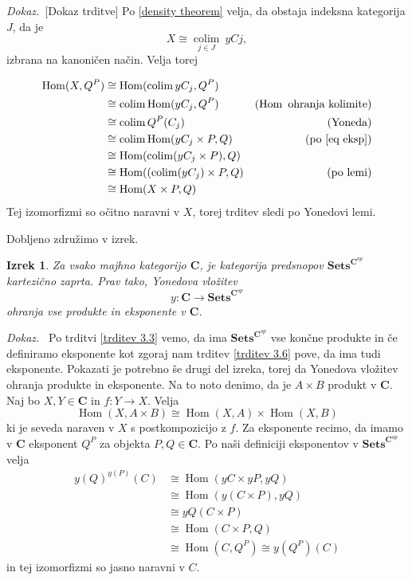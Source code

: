 \documentclass[12pt,a4paper]{book}
\theoremstyle{definition}
\theoremstyle{plain}
\newtheorem{izrek}[definicija]{Izrek}
\newenvironment{dokaz}{\emph{Dokaz.}\ }{\hspace{\fill}{$\Box$}}
\theoremstyle{definition}
\theoremstyle{remark}
\newcommand{\cat}[1]{\textbf{#1}}
\DeclareMathOperator{\Hom}{Hom}
\DeclareMathOperator{\colim}{colim}
\newcommand{\predsnop}[1]{\cat{Sets}^{\cat{#1}^{op}}}
\begin{document}
\begin{dokaz}[Dokaz trditve]
Po \ref{density theorem} velja, da obstaja indeksna kategorija $J$, da je
$$ X \cong \underset{j \in J}{\colim}\> yCj,$$
izbrana na kanoničen način. Velja torej

\begin{align*}
\Hom(X, Q^P) &\cong \Hom(\colim yC_j, Q^P) & \\
&\cong \colim\Hom(yC_j, Q^P) & (\Hom \text{ ohranja kolimite}) \\
&\cong \colim Q^P(C_j) & (\text{Yoneda}) \\
&\cong \colim \Hom(yC_j \times P, Q) & (\text{po \ref{eq eksp}}) \\
&\cong \Hom(\colim(yC_j \times P), Q) & \\
&\cong \Hom((\colim(yC_j) \times P, Q) & (\text{po lemi}) \\
&\cong \Hom(X \times P, Q) \\
\end{align*}
Tej izomorfizmi so očitno naravni v $X$, torej trditev sledi po Yonedovi lemi.
\end{dokaz}

Dobljeno združimo v izrek.

\begin{izrek}
Za vsako majhno kategorijo $\cat{C}$, je kategorija predsnopov $\predsnop{C}$ kartezično zaprta. Prav tako, Yonedova vložitev
$$y : \cat{C} \to \predsnop{C}$$
ohranja vse produkte in eksponente v $\cat{C}$.
\end{izrek}
\begin{dokaz}
Po trditvi \ref{trditev 3.3} vemo, da ima $\predsnop{C}$ vse končne produkte in če definiramo eksponente kot zgoraj nam trditev \ref{trditev 3.6} pove, da ima tudi eksponente.
Pokazati je potrebno še drugi del izreka, torej da Yonedova vložitev ohranja produkte in eksponente. Na to noto denimo, da je $A \times B$ produkt v $\cat{C}$.
Naj bo $X,Y \in \cat{C}$ in $f : Y \to X$. Velja
$$ \Hom(X, A\times B) \cong \Hom(X, A) \times \Hom(X,B) $$
ki je seveda naraven v $X$ s postkompozicijo z $f$.
Za eksponente recimo, da imamo v $\cat{C}$ eksponent $Q^P$ za objekta $P,Q \in \cat{C}$. Po naši definiciji eksponentov v $\predsnop{C}$ velja
\begin{align*}
y(Q)^{y(P)}(C) & \cong \Hom(yC \times yP, yQ) \\
&\cong \Hom(y(C \times P), yQ) \\
&\cong yQ(C \times P) \\
&\cong \Hom(C \times P, Q) \\
&\cong \Hom(C, Q^P) \cong y(Q^P)(C)
\end{align*}
in tej izomorfizmi so jasno naravni v $C$.
\end{dokaz}
\end{document}
